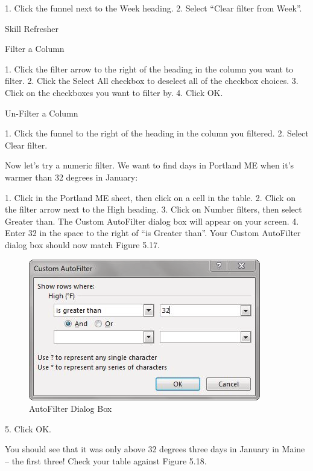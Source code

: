 1. Click the funnel next to the Week heading.
2. Select “Clear filter from Week”.


Skill Refresher


Filter a Column

1. Click the filter arrow to the right of the heading in the column you want to filter.
2. Click the Select All checkbox to deselect all of the checkbox choices.
3. Click on the checkboxes you want to filter by.
4. Click OK.

Un-Filter a Column

1. Click the funnel to the right of the heading in the column you filtered.
2. Select Clear filter.



Now let’s try a numeric filter. We want to find days in Portland ME when it’s warmer than 32
degrees in January:

1. Click in the Portland ME sheet, then click on a cell in the table.
2. Click on the filter arrow next to the High heading.
3. Click on Number filters, then select Greater than. The Custom AutoFilter dialog box will appear
on your screen.
4. Enter 32 in the space to the right of “is Greater than”. Your Custom AutoFilter dialog box should
now match Figure 5.17.


\begin{figure}[H]
	\centering
	\includegraphics[width=\maxwidth{.95\linewidth}]{gfx/ch05_fig17}
	\caption{AutoFilter Dialog Box}
	\label{05:fig17}
\end{figure}





5. Click OK.

You should see that it was only above 32 degrees three days in January in Maine – the first
three! Check your table against Figure 5.18.


